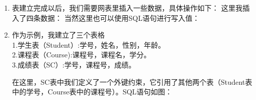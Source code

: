 \begin{enumerate}
\item 表建立完成以后，我们需要网表里插入一些数据，具体操作如下：
这里我插入了四条数据：
当然这里也可以使用SQL语句进行写入值：
\item 作为示例，我建立了三个表格
\\1.学生表（Student）:学号，姓名，性别，年龄。
\\2.课程表（Course):课程号，课程名，学分。
\\3.成绩表（SC）:学号，课程号，成绩。

在这里，SC表中我们定义了一个外键约束，它引用了其他两个表（Student表中的学号，Course表中的课程号）。SQL语句如图：
\end{enumerate}





